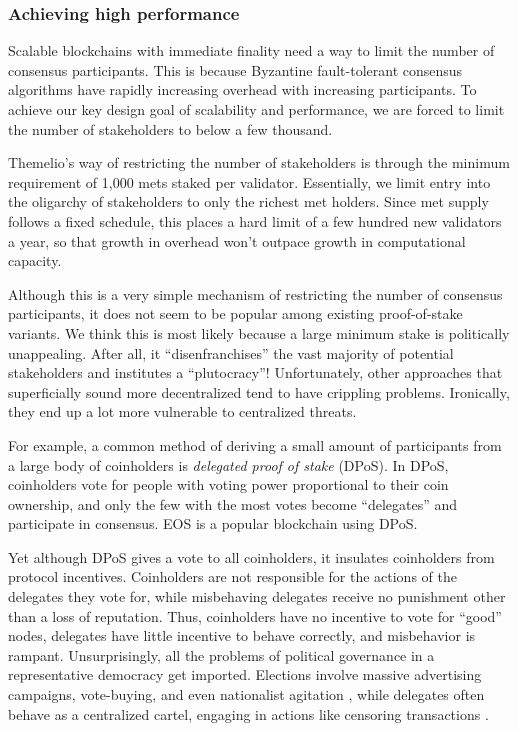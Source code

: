 \documentclass[headinclude]{scrbook}
\begin{document}
\subsubsection{Achieving high performance}

Scalable blockchains with immediate finality need a way to limit the number of consensus participants. This is because Byzantine fault-tolerant consensus algorithms have rapidly increasing overhead with increasing participants. To achieve our key design goal of scalability and performance, we are forced to limit the number of stakeholders to below a few thousand.

Themelio's way of restricting the number of stakeholders is through the minimum requirement of 1,000 mets staked per validator. Essentially, we limit entry into the oligarchy of stakeholders to only the richest met holders. Since met supply follows a fixed schedule, this places a hard limit of a few hundred new validators a year, so that growth in overhead won't outpace growth in computational capacity.

Although this is a very simple mechanism of restricting the number of consensus participants, it does not seem to be popular among existing proof-of-stake variants. We think this is most likely because a large minimum stake is politically unappealing. After all, it ``disenfranchises'' the vast majority of potential stakeholders and institutes a ``plutocracy''! Unfortunately, other approaches that superficially sound more decentralized tend to have crippling problems. Ironically, they end up a lot more vulnerable to centralized threats.

For example, a common method of deriving a small amount of participants from a large body of coinholders is \textit{delegated proof of stake} (DPoS). In DPoS, coinholders vote for people with voting power proportional to their coin ownership, and only the few with the most votes become ``delegates'' and participate in consensus. EOS is a popular blockchain using DPoS.

Yet although DPoS gives a vote to all coinholders, it insulates coinholders from protocol incentives. Coinholders are not responsible for the actions of the delegates they vote for, while misbehaving delegates receive no punishment other than a loss of reputation. Thus, coinholders have no incentive to vote for ``good'' nodes, delegates have little incentive to behave correctly, and misbehavior is rampant. Unsurprisingly, all the problems of political governance in a representative democracy get imported. Elections involve massive advertising campaigns, vote-buying, and even nationalist agitation \cite{zhihu2019votebuy}, while delegates often behave as a centralized cartel, engaging in actions like censoring transactions \cite{eoscensor}.
\end{document}

